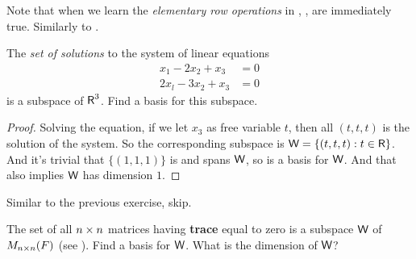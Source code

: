 \begin{note}
Note that when we learn the \emph{elementary row operations} in , ,  are immediately true.
Similarly to .
\end{note}

\begin{exercise} \label{exercise 1.6.13}
The \emph{set of solutions} to the system of linear equations
\begin{align*}
       x_1 - 2x_2 + x_3 & = 0 \\
      2x_l - 3x_2 + x_3 & = 0
\end{align*}
is a subspace of \(\textsf{R}^3\).
Find a basis for this subspace.
\end{exercise}

\begin{proof}
Solving the equation, if we let \(x_3\) as free variable \(t\), then all \((t, t, t)\) is the solution of the system.
So the corresponding subspace is \(\textsf{W} = \{ (t, t, t) : t \in \textsf{R} \}\).
And it's trivial that \(\{ (1, 1, 1) \}\) is \LID{} and spans \(\textsf{W}\), so is a basis for \(\textsf{W}\).
And that also implies \(\textsf{W}\) has dimension \(1\).
\end{proof}

\begin{exercise} \label{exercise 1.6.14}
Similar to the previous exercise, skip.
\end{exercise}

\begin{exercise} \label{exercise 1.6.15}
The set of all \(n \times n\) matrices having \textbf{trace} equal to zero is a subspace \(\textsf{W}\) of \(M_{n \times n}(F)\) (see ).
Find a basis for \(\textsf{W}\).
What is the dimension of \(\textsf{W}\)?
\end{exercise}

